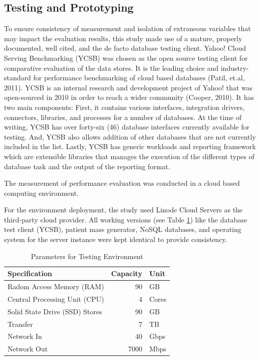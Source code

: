 \documentclass[5p]{elsarticle}
\begin{document}
\begin{enumerate}
\end{enumerate}


\subsection{Testing and Prototyping}
To ensure consistency of measurement and isolation of extraneous variables that may impact the evaluation results, 
this study made use of a mature, properly documented, well cited, and the de facto database testing client. 
Yahoo! Cloud Serving Benchmarking (YCSB) was chosen as the open source testing client for comparative evaluation of the data stores. It is the leading choice and industry-standard for performance benchmarking of cloud based databases (Patil, et.al, 2011).
YCSB is an internal research and development project of Yahoo! that was open-sourced in 2010 in order to reach a wider community (Cooper, 2010). It has two main components: First, it contains various interfaces, integration drivers, connectors, libraries, and processes for a number of databases. At the time of writing, YCSB has over forty-six (46) database interfaces currently available for testing. And, YCSB also allows addition of other databases that are not currently included in the list. Lastly, YCSB has generic workloads and reporting framework which are extensible libraries that manages the execution of the different types of database task and the output of the reporting format.

The measurement of performance evaluation was conducted in a cloud based computing environment. 

For the environment deployment, the study used Linode Cloud Servers as the third-party cloud provider. 
All working versions (see Table \ref{table.cloud.environment}) like the database test client (YCSB), patient mass generator, NoSQL databases, 
and operating system for the server instance were kept identical to provide consistency. 

\begin{table}[ht]
    \centering
    \caption{Parameters for Testing Environment}
     \label{table.cloud.environment}
        \begin{tabular}{lrl}
        \toprule
        Specification &  Capacity & Unit \\
        \hline
        Radom Access Memory (RAM)  & 90 &GB \\
        Central Processing Unit (CPU)  & 4 &Cores \\
        Solid State Drive (SSD) Stores  & 90 &GB \\
        Transfer &  7 &TB \\
        Network In &  40 &Gbps \\
        Network Out &  7000 &Mbps \\
        \hline
    \end{tabular}
\end{table}
\end{document}
